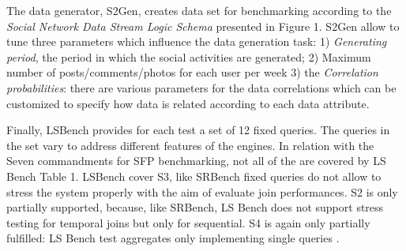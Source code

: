 
The data generator, S2Gen, creates data set for benchmarking according to the \textit{Social Network Data Stream Logic Schema} presented in \cite{LePhuoc2012c} Figure 1. S2Gen allow to tune three parameters which influence the data generation task: 1) \textit{Generating period}, the period in which the social activities are generated; 2) Maximum number of posts/comments/photos for each user per week 3) the \textit{Correlation probabilities}: there are various parameters for the data correlations which can be customized to specify how data is related according to each data attribute.

Finally, LSBench \cite{LePhuoc2012c} provides for each test a set of 12 fixed queries. The queries in the set vary to address different features of the engines. In relation with the Seven commandments for SFP benchmarking, not all of the are covered by LS Bench \cite{DBLP:conf/esws/ScharrenbachUMVB13} Table 1. LSBench cover S3, like SRBench fixed queries do not allow to stress the system properly with the aim of evaluate join performances. S2 is only partially supported, because, like SRBench, LS Bench does not support stress testing for temporal joins but only for sequential. S4 is again only partially fulfilled: LS Bench test aggregates only implementing single queries  \cite{DBLP:conf/esws/ScharrenbachUMVB13}.



